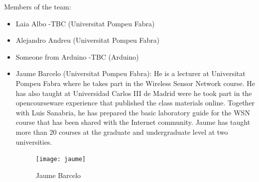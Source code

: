 \documentclass[oneside]{book}   %
\begin{document}
Members of the team:
\begin{itemize}
\item Laia Albo -TBC (Universitat Pompeu Fabra)
\item Alejandro Andreu (Universitat Pompeu Fabra)
\item Someone from Arduino -TBC (Arduino)
\item Jaume Barcelo (Universitat Pompeu Fabra): He is a lecturer at Universitat Pompeu Fabra where he takes part in the Wireless Sensor Network course. He has also taught at Universidad Carlos III de Madrid were he took part in the opencourseware experience that published the class materials online. Together with Luis Sanabria, he has prepared the basic laboratory guide for the WSN course that has been shared with the Internet community. Jaume has taught more than 20 courses at the graduate and undergraduate level at two universities.
\begin{figure}
\begin{center}
\texttt{[image: jaume]}
\caption{Jaume Barcelo}
\label{fig:jaume}
\end{center}
\end{figure}


\end{itemize}
\end{document}
